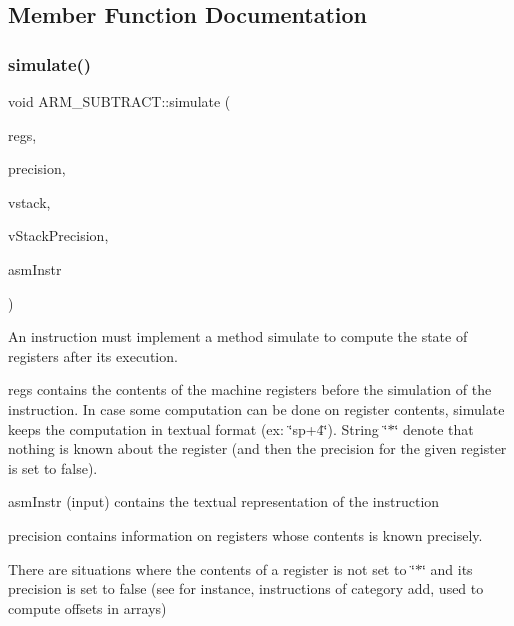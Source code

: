 \subsection{Member Function Documentation}
\mbox{\label{classARM__SUBTRACT_abf5d28fd7366c3310ebe6bbb9b08e26e}} 
\subsubsection{\texorpdfstring{simulate()}{simulate()}}
{\footnotesize\ttfamily void A\+R\+M\+\_\+\+S\+U\+B\+T\+R\+A\+C\+T\+::simulate (\begin{DoxyParamCaption}\item[{\hyperlink{DAAInstruction_8h_af0fae93a861de9cf37988d5673cac523}{reg\+Table} \&}]{regs,  }\item[{\hyperlink{DAAInstruction_8h_a0e8cae02815a5f8adc750122d790b455}{reg\+Precision\+Table} \&}]{precision,  }\item[{\hyperlink{DAAInstruction_8h_a1b0e70ac1a04f06c8132055ed01f589f}{stack\+Type} \&}]{vstack,  }\item[{\hyperlink{DAAInstruction_8h_ac5cb793e9dac3fa9693da78b7e29ab30}{stack\+Prec\+Type} \&}]{v\+Stack\+Precision,  }\item[{const string \&}]{asm\+Instr }\end{DoxyParamCaption})\hspace{0.3cm}{\ttfamily [virtual]}}

An instruction must implement a method simulate to compute the state of registers after its execution.

regs contains the contents of the machine registers before the simulation of the instruction. In case some computation can be done on register contents, simulate keeps the computation in textual format (ex\+: \char`\"{}sp+4\char`\"{}). String \char`\"{}$\ast$\char`\"{} denote that nothing is known about the register (and then the precision for the given register is set to false).

asm\+Instr (input) contains the textual representation of the instruction

precision contains information on registers whose contents is known precisely.

There are situations where the contents of a register is not set to \char`\"{}$\ast$\char`\"{} and its precision is set to false (see for instance, instructions of category add, used to compute offsets in arrays)


